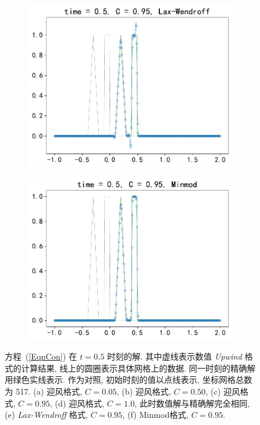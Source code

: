 \documentclass[10.5pt
]{article}
\begin{document}
\begin{figure}
\begin{subfigure}{.48\linewidth}
  \includegraphics[width=\textwidth]{figures/problem1_lax_wendroff0.95.pdf}
  \caption{}
  \label{fig:problem1-5}
\end{subfigure}
\hfill
\begin{subfigure}{.48\linewidth}
  \includegraphics[width=\textwidth]{figures/problem1_limiter0.95.pdf}
  \caption{}
  \label{fig:problem1-6}
\end{subfigure}
\caption{方程~(\ref{EqnCon}) 在 $t=0.5$ 时刻的解. 其中虚线表示数值 \textit{Upwind} 格式的计算结果, 线上的圆圈表示具体网格上的数据. 同一时刻的精确解用绿色实线表示. 作为对照,
  初始时刻的值以点线表示, 坐标网格总数为 517. (a) 迎风格式, $C = 0.05$, (b)  迎风格式, $C = 0.50$, (c)  迎风格式, $C = 0.95$, (d) 迎风格式, $C = 1.0$,
  此时数值解与精确解完全相同, (e) \textit{Lax-Wendroff} 格式, $C = 0.95$,  (f) Minmod格式, $C = 0.95$.} \label{fig:problem1}
\end{figure}
\end{document}
